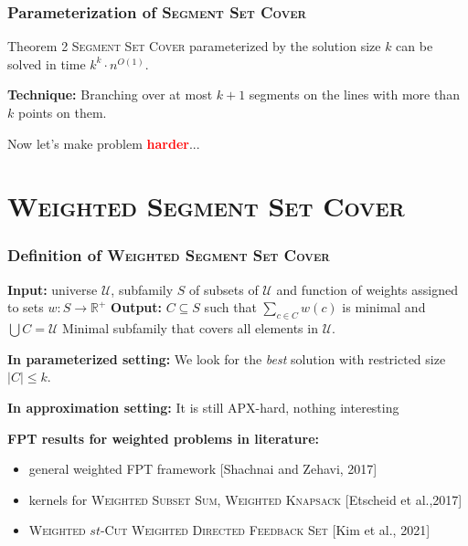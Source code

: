 \documentclass{beamer}
\begin{document}
\begin{frame}
\frametitle{Parameterization of \textsc{Segment Set Cover}}
\begin{block}{Theorem 2}
	\textsc{Segment Set Cover} parameterized by the solution size $k$
	can be solved in time $k^k \cdot n^{O(1)}$.
\end{block}

\textbf{Technique:} Branching over at most $k+1$
segments on the lines with more than $k$ points on them.

\pause

\bigskip

Now let's make problem \textcolor{red}{\textbf{harder}}...

\end{frame}

\section{\textsc{Weighted Segment Set Cover}} 

\begin{frame}
\frametitle{Definition of \textsc{Weighted Segment Set Cover}}

\textbf{Input:} universe $\mathcal{U}$,
subfamily $S$ of subsets of $\mathcal{U}$
and function of weights assigned to sets $w : S \rightarrow \mathbb{R^+}$
\newline
\textbf{Output:} $C \subseteq S$ such that $\sum_{c \in C} w(c)$ is minimal and
$\bigcup C = \mathcal{U}$
\newline
Minimal subfamily that covers all elements in $\mathcal{U}$.

\pause

\bigskip
\textbf{In parameterized setting:}
We look for the \textit{best} solution with restricted size $|C| \le k$.

\textbf{In approximation setting:}
It is still APX-hard, nothing interesting
\bigskip
\pause

\textbf{FPT results for weighted problems in literature:}
\begin{itemize}
\item general weighted FPT framework {[Shachnai and Zehavi, 2017]}
\item kernels for \textsc{Weighted Subset Sum}, \textsc{Weighted Knapsack} {[Etscheid et al.,2017]}
\item \textsc{Weighted $st$-Cut} \textsc{Weighted Directed Feedback Set} {[Kim et al., 2021]}
\end{itemize}


\end{frame}
\end{document}
